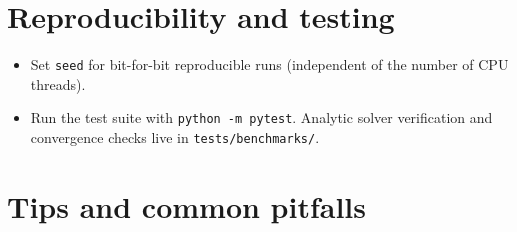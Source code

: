 \documentclass[11pt]{article}
\newcommand{\code}[1]{\texttt{#1}}
\begin{document}
\section{Reproducibility and testing}
\begin{itemize}
  \item Set \code{seed} for bit-for-bit reproducible runs (independent of the
        number of CPU threads).
  \item Run the test suite with \code{python -m pytest}. Analytic solver
        verification and convergence checks live in \code{tests/benchmarks/}.
\end{itemize}

\section{Tips and common pitfalls}
\end{document}
